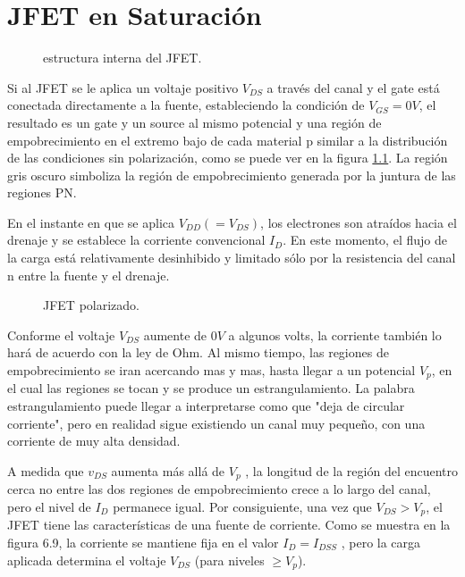 \chapter{JFET en Saturación}
  \begin{figure}
  \vspace{-1cm}
    \centering
    \resizebox{!}{\linewidth}{
    
    }
    \caption{estructura interna del JFET.}
    \label{fig:jfet.nopol}
  \end{figure}
  Si al JFET se le aplica un voltaje positivo $V_{DS}$ a través del canal y el gate está conectada directamente a la
  fuente, estableciendo la condición de $V_{GS} = 0 V$, el resultado es un gate y un source al mismo potencial y una
  región de empobrecimiento en el extremo bajo de cada material p similar a la distribución de las condiciones sin
  polarización, como se puede ver en la figura \ref{fig:jfet.nopol}. La región gris oscuro simboliza la región de
  empobrecimiento generada por la juntura de las regiones PN.

  En el instante en que se aplica $V_{DD} (= V_{DS})$, los electrones son atraídos hacia el drenaje y se establece la
  corriente convencional $I_D$. En este momento, el flujo de la carga está relativamente desinhibido y limitado sólo
  por la resistencia del canal n entre la fuente y el drenaje.

  \begin{figure}
    \centering
    \resizebox{!}{\linewidth}{
    
    }
    \caption{JFET polarizado.}
    \label{fig:jfet.pol-sat}
  \end{figure}
  Conforme el voltaje $V_{DS}$ aumente de $0V$ a algunos volts, la corriente también lo hará de acuerdo con la ley de Ohm.
  Al mismo tiempo, las regiones de empobrecimiento se iran acercando mas y mas, hasta llegar a un potencial $V_p$, en el
  cual las regiones se tocan y se produce un estrangulamiento. La palabra estrangulamiento puede llegar a interpretarse
  como que "deja de circular corriente", pero en realidad sigue existiendo un canal muy pequeño, con una corriente de
  muy alta densidad.

  A medida que $v_{DS}$ aumenta más allá de $V_p$ , la longitud de la región del encuentro cerca no entre las dos
  regiones de empobrecimiento crece a lo largo del canal, pero el nivel de $I_D$ permanece igual. Por consiguiente, una
  vez que $V_{DS} > V_p$, el JFET tiene las características de una fuente de corriente. Como se muestra en la figura
  6.9, la corriente se mantiene fija en el valor $I_D = I_{DSS}$ , pero la carga aplicada determina el voltaje $V_{DS}$
  (para niveles $\geq V_p$).


